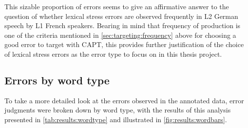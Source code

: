 		
		
		This sizable proportion of errors seems to give an affirmative answer to the question of whether lexical stress errors are observed frequently in L2 German speech by L1 French speakers. Bearing in mind that frequency of production is one of the criteria mentioned in \cref{sec:targeting:frequency} above for choosing a good error to target with CAPT, this provides further justification of the choice of lexical stress errors as the error type to focus on in this thesis project.
		
		\subsection{Errors by word type}
		\label{sec:results:wordtype}
			
			To take a more detailed look at the errors observed in the annotated data, error judgments were broken down by word type, with the results of this analysis presented in \cref{tab:results:wordtype} and illustrated in \cref{fig:results:wordbars}. 
			
			
			
